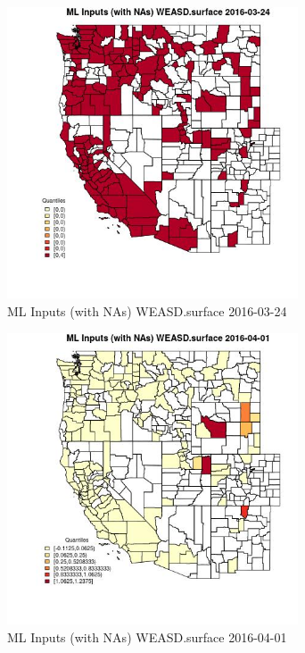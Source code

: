 \begin{figure} 
\centering  
\includegraphics[width=0.77\textwidth]{Code_Outputs/Report_ML_input_PM25_Step4_part_e_de_duplicated_aveswNAs_CountyWEASDsurfaceMean2016-03-24_2016-03-24.jpg} 
\caption{\label{fig:Report_ML_input_PM25_Step4_part_e_de_duplicated_aveswNAsCountyWEASDsurfaceMean2016-03-24_2016-03-24}ML Inputs (with NAs) WEASD.surface 2016-03-24} 
\end{figure} 
 

\begin{figure} 
\centering  
\includegraphics[width=0.77\textwidth]{Code_Outputs/Report_ML_input_PM25_Step4_part_e_de_duplicated_aveswNAs_CountyWEASDsurfaceMean2016-04-01_2016-04-01.jpg} 
\caption{\label{fig:Report_ML_input_PM25_Step4_part_e_de_duplicated_aveswNAsCountyWEASDsurfaceMean2016-04-01_2016-04-01}ML Inputs (with NAs) WEASD.surface 2016-04-01} 
\end{figure} 
 

